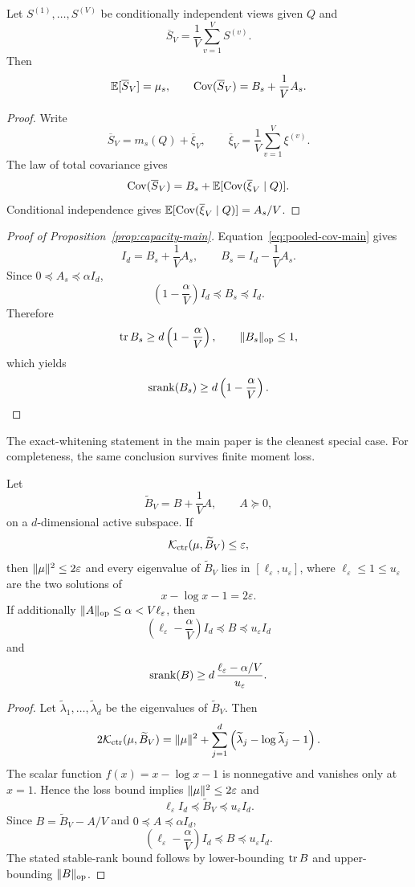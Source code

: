 \begin{proposition}
\label{prop:finite-centers}
Let $S^{(1)},\ldots,S^{(V)}$ be conditionally independent views given $Q$ and
\[
\overline S_V=\frac1V\sum_{v=1}^V S^{(v)}.
\]
Then
\[
\mathbb{E}[\overline S_V]=\mu_s,
\qquad
\operatorname{Cov}(\overline S_V)=B_s+\frac1V A_s.
\]
\end{proposition}

\begin{proof}
Write
\[
\overline S_V=m_s(Q)+\overline\xi_V,
\qquad
\overline\xi_V=\frac1V\sum_{v=1}^V\xi^{(v)}.
\]
The law of total covariance gives
\[
\operatorname{Cov}(\overline S_V)
=
B_s+\mathbb{E}[\operatorname{Cov}(\overline\xi_V\mid Q)].
\]
Conditional independence gives
$\mathbb{E}[\operatorname{Cov}(\overline\xi_V\mid Q)]=A_s/V$.
\end{proof}

\begin{proof}[Proof of Proposition~\ref{prop:capacity-main}]
Equation~\eqref{eq:pooled-cov-main} gives
\[
I_d=B_s+\frac1V A_s,
\qquad
B_s=I_d-\frac1V A_s.
\]
Since $0\preceq A_s\preceq\alpha I_d$,
\[
\left(1-\frac{\alpha}{V}\right)I_d
\preceq B_s\preceq I_d.
\]
Therefore
\[
\operatorname{tr} B_s\ge d\left(1-\frac{\alpha}{V}\right),
\qquad
\lVert B_s\rVert_{\rm op}\le1,
\]
which yields
\[
\operatorname{srank}(B_s)\ge d\left(1-\frac{\alpha}{V}\right).
\]
\end{proof}

The exact-whitening statement in the main paper is the cleanest special case.
For completeness, the same conclusion survives finite moment loss.

\begin{theorem}\label{thm:kl}
Let
\[
\widetilde B_V=B+\frac1V A,
\qquad
A\succeq0,
\]
on a $d$-dimensional active subspace. If
\[
\mathcal{K}_{\rm ctr}(\mu,\widetilde B_V)\le\varepsilon,
\]
then $\lVert \mu\rVert^2\le2\varepsilon$ and every eigenvalue of
$\widetilde B_V$ lies in $[\ell_\varepsilon,u_\varepsilon]$, where
$\ell_\varepsilon\le1\le u_\varepsilon$ are the two solutions of
\[
x-\log x-1=2\varepsilon.
\]
If additionally $\lVert A\rVert_{\rm op}\le\alpha<V\ell_\varepsilon$, then
\[
\left(\ell_\varepsilon-\frac{\alpha}{V}\right)I_d
\preceq B\preceq u_\varepsilon I_d
\]
and
\[
\operatorname{srank}(B)
\ge
d\,\frac{\ell_\varepsilon-\alpha/V}{u_\varepsilon}.
\]
\end{theorem}

\begin{proof}
Let $\widetilde\lambda_1,\ldots,\widetilde\lambda_d$ be the eigenvalues of
$\widetilde B_V$. Then
\[
2\mathcal{K}_{\rm ctr}(\mu,\widetilde B_V)
=
\lVert \mu\rVert^2+
\sum_{j=1}^d
\left(\widetilde\lambda_j-\log\widetilde\lambda_j-1\right).
\]
The scalar function $f(x)=x-\log x-1$ is nonnegative and vanishes only at
$x=1$. Hence the loss bound implies $\lVert \mu\rVert^2\le2\varepsilon$ and
\[
\ell_\varepsilon I_d
\preceq\widetilde B_V
\preceq u_\varepsilon I_d.
\]
Since $B=\widetilde B_V-A/V$ and
$0\preceq A\preceq\alpha I_d$,
\[
\left(\ell_\varepsilon-\frac{\alpha}{V}\right)I_d
\preceq B\preceq u_\varepsilon I_d.
\]
The stated stable-rank bound follows by lower-bounding $\operatorname{tr} B$ and
upper-bounding $\lVert B\rVert_{\rm op}$.
\end{proof}


